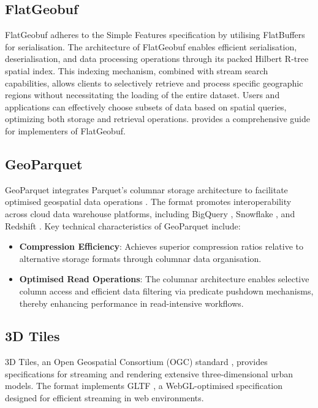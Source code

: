 \subsection{FlatGeobuf}
\label{rw:cloud_optimised_implementations:flatgeobuf}
FlatGeobuf adheres to the Simple Features \citet{simple_features} specification by utilising FlatBuffers \citep{flatbuffers} for serialisation.
The architecture of FlatGeobuf enables efficient serialisation, deserialisation, and data processing operations through its packed Hilbert R-tree spatial index.
This indexing mechanism, combined with stream search capabilities, allows clients to selectively retrieve and process specific geographic regions without necessitating the loading of the entire dataset.
Users and applications can effectively choose subsets of data based on spatial queries, optimizing both storage and retrieval operations.
\citet{horance_2022_detail} provides a comprehensive guide for implementers of FlatGeobuf.

\subsection{GeoParquet}
\label{rw:cloud_optimised_implementations:geoparquet}
GeoParquet integrates Parquet's columnar storage architecture to facilitate optimised geospatial data operations \citep{geoparquet}. The format promotes interoperability across cloud data warehouse platforms, including BigQuery \citep{bigquery}, Snowflake \citep{snowflake}, and Redshift \citep{redshift}. Key technical characteristics of GeoParquet include:

\begin{itemize}
  \item \textbf{Compression Efficiency}: Achieves superior compression ratios relative to alternative storage formats through columnar data organisation.
  \item \textbf{Optimised Read Operations}: The columnar architecture enables selective column access and efficient data filtering via predicate pushdown mechanisms, thereby enhancing performance in read-intensive workflows.
\end{itemize}

\subsection{3D Tiles}
\label{rw:cloud_optimised_implementations:3d_tiles}
3D Tiles, an Open Geospatial Consortium (OGC) standard \citep{3d_tiles}, provides specifications for streaming and rendering extensive three-dimensional urban models. The format implements GLTF \citep{gltf}, a WebGL-optimised specification designed for efficient streaming in web environments.

